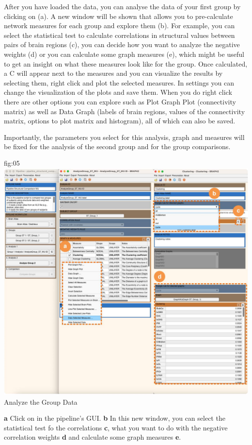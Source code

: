 \documentclass[justified]{tufte-handout}
\begin{document}
{{{After you have loaded the data, you can analyse the data of your first group by clicking on  (a). A new window will be shown that allows you to pre-calculate network measures for each group and explore them (b). For example, you can select the statistical test to calculate correlations in structural values between pairs of brain regions (c), you can decide how you want to analyze the negative weights (d) or you can calculate some graph measures (e), which might be useful to get an insight on what these measures look like for the group. Once calculated, a C will appear next to the measures and you can visualize the results by selecting them, right click and plot the selected measures. In settings you can change the visualization of the plots and save them. When you do right click there are other options you can explore such as Plot Graph Plot (connectivity matrix) as well as Data Graph (labels of brain regions, values of the connectivity matrix, options to plot matrix and histogram), all of which can also be saved.

Importantly, the parameters you select for this analysis, graph and measures will be fixed for the analysis of the second group and for the group comparisons.

	{fig:05}
	{
	\includegraphics{fig05.jpg}
	}
	{Analyze the Group Data}
	{
	{\bf a} Click on  in the pipeline's GUI.
	{\bf b} In this new window, you can select the statistical test fo the correlations {\bf c}, what you want to do with the negative correlation weights {\bf d} and calculate some graph measures {\bf e}.

}}}}
\end{document}
